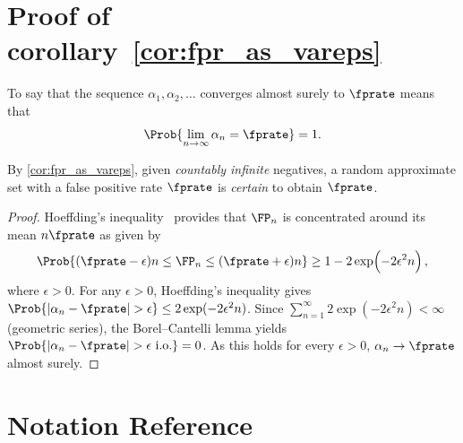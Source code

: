 

\section{Proof of corollary~\ref{cor:fpr_as_vareps}}
\label{app:cor_fpr_as_vareps}
To say that the sequence $\alpha_1,\alpha_2,\ldots$ converges almost surely to $\fprate$ means that
\begin{equation}
\Prob{\lim _{n \to \infty} \alpha_n = \fprate} = 1.
\end{equation}

By \cref{cor:fpr_as_vareps}, given \emph{countably infinite} negatives, a random approximate set with a false positive rate $\fprate$ is \emph{certain} to obtain $\fprate$.
\begin{proof}
Hoeffding's inequality~\cite{hoeffding} provides that $\FP_n$ is concentrated around its mean $n \fprate$ as given by
\begin{equation}
\Prob{(\fprate -\epsilon) n \leq \FP_n \leq (\fprate + \epsilon )n}
\geq 1 - 2 \exp\!\left(-2\epsilon ^2 n\right),
\end{equation}
where $\epsilon > 0$.
For any $\epsilon > 0$, Hoeffding's inequality gives $\Prob{|\alpha_n - \fprate| > \epsilon} \leq 2\exp(-2\epsilon^2 n)$.
Since $\sum_{n=1}^{\infty} 2\exp(-2\epsilon^2 n) < \infty$ (geometric series), the Borel--Cantelli lemma yields $\Prob{|\alpha_n - \fprate| > \epsilon \text{ i.o.}} = 0$.
As this holds for every $\epsilon > 0$, $\alpha_n \to \fprate$ almost surely.
\end{proof}

\section{Notation Reference}

